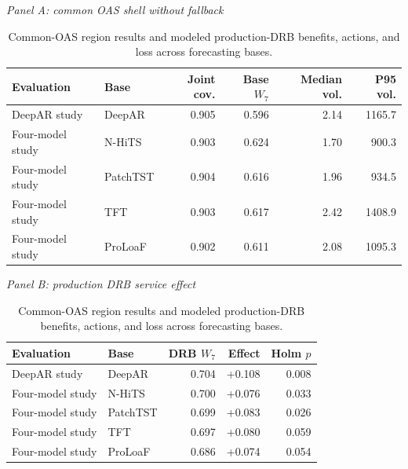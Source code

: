
\begin{table}[p]
\centering
\caption{Common-OAS region results and modeled production-DRB
benefits, actions, and loss across forecasting bases.}
\label{tab:deep-common}
\footnotesize
\setlength{\tabcolsep}{4pt}
\textit{Panel A: common OAS shell without fallback}\\[2pt]
\begin{tabular}{llrrrr}
\toprule
Evaluation & Base & Joint cov. & Base $W_7$ & Median vol. & P95 vol. \\
\midrule
DeepAR study & DeepAR & 0.905 & 0.596 & 2.14 & 1165.7 \\
Four-model study & N-HiTS & 0.903 & 0.624 & 1.70 & 900.3 \\
Four-model study & PatchTST & 0.904 & 0.616 & 1.96 & 934.5 \\
Four-model study & TFT & 0.903 & 0.617 & 2.42 & 1408.9 \\
Four-model study & ProLoaF & 0.902 & 0.611 & 2.08 & 1095.3 \\
\bottomrule
\end{tabular}

\vspace{6pt}
\textit{Panel B: production DRB service effect}\\[2pt]
\begin{tabular}{llrrr}
\toprule
Evaluation & Base & DRB $W_7$ & Effect & Holm $p$ \\
\midrule
DeepAR study & DeepAR & 0.704 & +0.108 & 0.008 \\
Four-model study & N-HiTS & 0.700 & +0.076 & 0.033 \\
Four-model study & PatchTST & 0.699 & +0.083 & 0.026 \\
Four-model study & TFT & 0.697 & +0.080 & 0.059 \\
Four-model study & ProLoaF & 0.686 & +0.074 & 0.054 \\
\bottomrule
\end{tabular}


\end{table}
